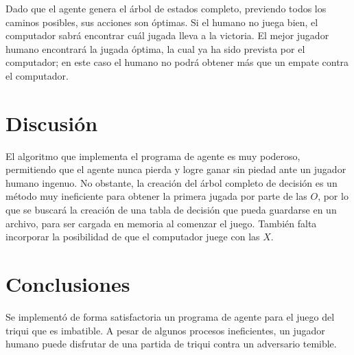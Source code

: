 \documentclass[11pt]{article}
\begin{document}
Dado que el agente genera el árbol de estados completo, previendo todos los caminos posibles, sus acciones son óptimas. Si el humano no juega bien, el computador sabrá encontrar cuál jugada lleva a la victoria. El mejor jugador humano encontrará la jugada óptima, la cual ya ha sido prevista por el computador; en este caso el humano no podrá obtener más que un empate contra el computador.


\section{Discusión}

\noindent El algoritmo que implementa el programa de agente es muy poderoso, permitiendo que el agente nunca pierda y logre ganar sin piedad ante un jugador humano ingenuo. No obstante, la creación del árbol completo de decisión es un método muy ineficiente para obtener la primera jugada por parte de las $O$, por lo que se buscará la creación de una tabla de decisión que pueda guardarse en un archivo, para ser cargada en memoria al comenzar el juego. También falta incorporar la posibilidad de que el computador juege con las $X$.

\section{Conclusiones}

\noindent Se implementó de forma satisfactoria un programa de agente para el juego del triqui que es imbatible. A pesar de algunos procesos ineficientes, un jugador humano puede disfrutar de una partida de triqui contra un adversario temible.



\end{document}
